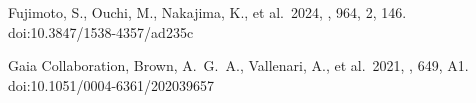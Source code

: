 \documentclass[trackchanges,twocolumn]{aastex701}
\newcommand{\cq}[1]{\textcolor{black}{#1}}
\begin{document}

 Fujimoto, S., Ouchi, M., Nakajima, K., et al.\ 2024, \apj, 964, 2, 146. doi:10.3847/1538-4357/ad235c

 Gaia Collaboration, Brown, A.~G.~A., Vallenari, A., et al.\ 2021, \aap, 649, A1. doi:10.1051/0004-6361/202039657
\end{document}
